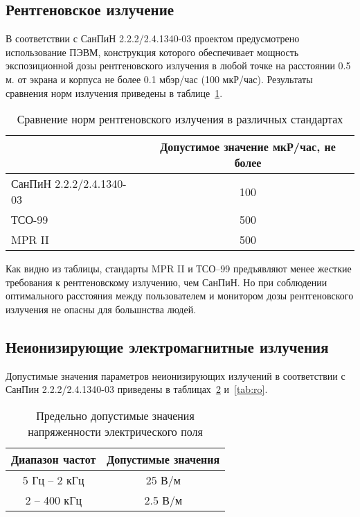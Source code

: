 \subsection{Рентгеновское излучение}

В соответствии с СанПиН 2.2.2/2.4.1340-03 проектом предусмотрено использование ПЭВМ, конструкция которого обеспечивает мощность экспозиционной дозы рентгеновского излучения в любой точке на расстоянии 0.5 м. от экрана и корпуса не более 0.1 мбэр/час (100 мкР/час). Результаты сравнения норм излучения приведены в таблице~\ref{tab:rentgen}.

\begin{table}[ht]
\caption{Сравнение норм рентгеновского излучения в различных стандартах}
\begin{tabular}{|l|c|}
\hline
& Допустимое значение мкР/час, не более \\
\hline
СанПиН 2.2.2/2.4.1340-03 & 100 \\
\hline
ТСО-99 & 500 \\
\hline
MPR II & 500\\
\hline
\end{tabular}
\label{tab:rentgen}
\end{table}

Как видно из таблицы, стандарты MPR II и ТСО--99 предъявляют менее жесткие требования к рентгеновскому излучению, чем СанПиН. Но при соблюдении оптимального расстояния между пользователем и монитором дозы рентгеновского излучения не опасны для большнства людей.

\subsection{Неионизирующие электромагнитные излучения}

Допустимые значения параметров неионизирующих излучений в соответствии с СанПин 2.2.2/2.4.1340-03 приведены в таблицах~\ref{tab:U} и~\ref{tab:ro}.

\begin{table}[ht]
\caption{Предельно допустимые значения напряженности электрического поля}
\begin{tabular}{|c|c|}
\hline
Диапазон частот& Допустимые значения \\
\hline
5 Гц -- 2 кГц & 25 В/м \\
\hline
2 -- 400 кГц& 2.5 В/м \\
\hline
\end{tabular}
\label{tab:U}
\end{table}

